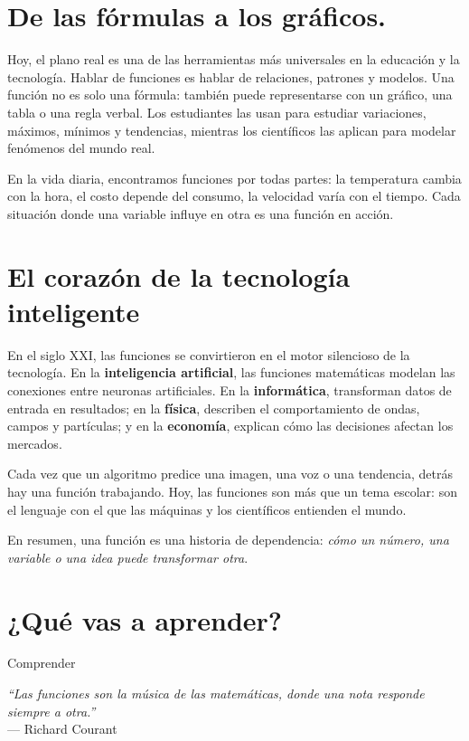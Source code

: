 \section*{De las fórmulas a los gráficos.}
\begin{reseñaplana}
Hoy, el plano real es una de las herramientas más universales en la educación y la tecnología.  Hablar de funciones es 
hablar de relaciones, patrones y modelos.  
Una función no es solo una fórmula: también puede representarse con un gráfico, una tabla o una regla verbal.  
Los estudiantes las usan para estudiar variaciones, máximos, mínimos y tendencias, mientras los científicos las 
aplican para modelar fenómenos del mundo real.  

En la vida diaria, encontramos funciones por todas partes:  
la temperatura cambia con la hora, el costo depende del consumo, la velocidad varía con el tiempo.  
Cada situación donde una variable influye en otra es una función en acción.
\end{reseñaplana}  

\section*{El corazón de la tecnología inteligente} 
\begin{reseñaplana} 
En el siglo XXI, las funciones se convirtieron en el motor silencioso de la tecnología.  
En la \textbf{inteligencia artificial}, las funciones matemáticas modelan las conexiones entre neuronas artificiales.  
En la \textbf{informática}, transforman datos de entrada en resultados; en la \textbf{física}, describen el 
comportamiento de ondas, campos y partículas; y en la \textbf{economía}, explican cómo las decisiones afectan los mercados.  

Cada vez que un algoritmo predice una imagen, una voz o una tendencia, detrás hay una función trabajando.  
Hoy, las funciones son más que un tema escolar: son el lenguaje con el que las máquinas y los científicos entienden el mundo.  

En resumen, una función es una historia de dependencia:  
\textit{cómo un número, una variable o una idea puede transformar otra}.
\end{reseñaplana}

\section*{¿Qué vas a aprender?}
\begin{aprende}
  \item Comprender 
\end{aprende}


\vspace{1cm}
\begin{flushright}
  {\oneptup\itshape ``Las funciones son la música de las matemáticas, donde una nota responde siempre a otra.''}\\
  {\oneptup — Richard Courant}
\end{flushright}


